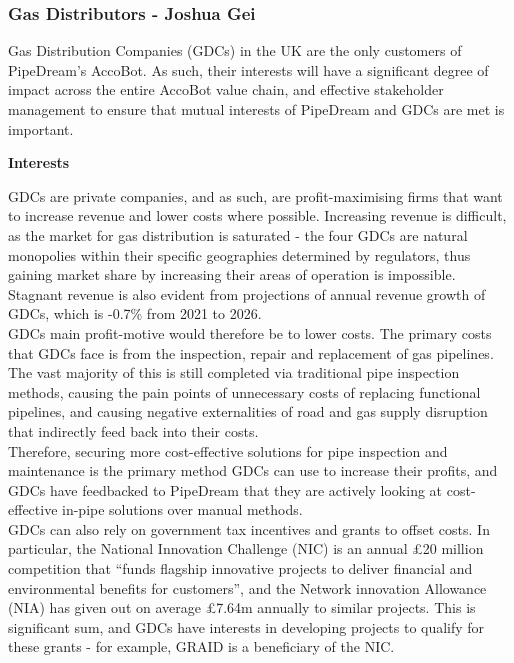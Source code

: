 \documentclass[11pt]{article}		%
\begin{document}
		\subsubsection[Gas Distributors]{Gas Distributors - Joshua Gei} \label{GDCstakeholders}
	
		Gas Distribution Companies (GDCs) in the UK are the only customers of PipeDream’s AccoBot. As such, their interests will have a significant degree of impact across the entire AccoBot value chain, and effective stakeholder management to ensure that mutual interests of PipeDream and GDCs are met is important. 
	
	    \textbf{Interests}
	    
	    GDCs are private companies, and as such, are profit-maximising firms that want to increase revenue and lower costs where possible. Increasing revenue is difficult, as the market for gas distribution is saturated - the four GDCs are natural monopolies within their specific geographies determined by regulators, thus gaining market share by increasing their areas of operation is impossible. Stagnant revenue is also evident from projections of annual revenue growth of GDCs, which is -0.7\% from 2021 to 2026.
        \\ \hspace*{3ex}GDCs main profit-motive would therefore be to lower costs. The primary costs that GDCs face is from the inspection, repair and replacement of gas pipelines. The vast majority of this is still completed via traditional pipe inspection methods, causing the pain points of unnecessary costs of replacing functional pipelines, and causing negative externalities of road and gas supply disruption that indirectly feed back into their costs. 
        \\ \hspace*{3ex}Therefore, securing more cost-effective solutions for pipe inspection and maintenance is the primary method GDCs can use to increase their profits, and GDCs have feedbacked to PipeDream that they are actively looking at cost-effective in-pipe solutions over manual methods. 
        \\ \hspace*{3ex}GDCs can also rely on government tax incentives and grants to offset costs. In particular, the National Innovation Challenge (NIC) is an annual £20 million competition that “funds flagship innovative projects to deliver financial and environmental benefits for customers”, and the Network innovation Allowance (NIA) has given out on average £7.64m annually to similar projects. This is significant sum, and GDCs have interests in developing projects to qualify for these grants - for example, GRAID is a beneficiary of the NIC.  
        
\end{document}
